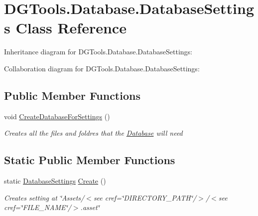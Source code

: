 \hypertarget{class_d_g_tools_1_1_database_1_1_database_settings}{}\section{D\+G\+Tools.\+Database.\+Database\+Settings Class Reference}
\label{class_d_g_tools_1_1_database_1_1_database_settings}


Inheritance diagram for D\+G\+Tools.\+Database.\+Database\+Settings\+:


Collaboration diagram for D\+G\+Tools.\+Database.\+Database\+Settings\+:
\subsection*{Public Member Functions}
\begin{DoxyCompactItemize}
\item 
void \mbox{\hyperlink{class_d_g_tools_1_1_database_1_1_database_settings_af3911150d87eb4225af54c4ca00f426e}{Create\+Database\+For\+Settings}} ()
\begin{DoxyCompactList}\small\item\em Creates all the files and foldres that the \mbox{\hyperlink{class_d_g_tools_1_1_database_1_1_database}{Database}} will need \end{DoxyCompactList}\end{DoxyCompactItemize}
\subsection*{Static Public Member Functions}
\begin{DoxyCompactItemize}
\item 
static \mbox{\hyperlink{class_d_g_tools_1_1_database_1_1_database_settings}{Database\+Settings}} \mbox{\hyperlink{class_d_g_tools_1_1_database_1_1_database_settings_a276623c57d9ad733ac656b4acfdda666}{Create}} ()
\begin{DoxyCompactList}\small\item\em Creates setting at \char`\"{}\+Assets/$<$see cref=\char`\"{}D\+I\+R\+E\+C\+T\+O\+R\+Y\+\_\+\+P\+A\+TH\char`\"{}/$>$/$<$see cref=\char`\"{}F\+I\+L\+E\+\_\+\+N\+A\+ME\char`\"{}/$>$.\+asset\char`\"{} \end{DoxyCompactList}\end{DoxyCompactItemize}
